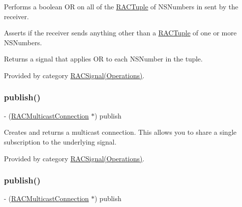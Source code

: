 Performs a boolean OR on all of the \mbox{\hyperlink{interface_r_a_c_tuple}{R\+A\+C\+Tuple}} of N\+S\+Numbers in sent by the receiver.

Asserts if the receiver sends anything other than a \mbox{\hyperlink{interface_r_a_c_tuple}{R\+A\+C\+Tuple}} of one or more N\+S\+Numbers.

Returns a signal that applies OR to each N\+S\+Number in the tuple. 

Provided by category \mbox{\hyperlink{category_r_a_c_signal_07_operations_08_aaf19b8314c8e554a7e5140ebffcd4f98}{R\+A\+C\+Signal(\+Operations)}}.

\mbox{\label{interface_r_a_c_signal_a16f260eea2cfd9a3953b95926d442a93}} 
\subsubsection{\texorpdfstring{publish()}{publish()}\hspace{0.1cm}{\footnotesize\ttfamily [1/3]}}
{\footnotesize\ttfamily -\/ (\mbox{\hyperlink{interface_r_a_c_multicast_connection}{R\+A\+C\+Multicast\+Connection}} $\ast$) publish \begin{DoxyParamCaption}{ }\end{DoxyParamCaption}}

Creates and returns a multicast connection. This allows you to share a single subscription to the underlying signal. 

Provided by category \mbox{\hyperlink{category_r_a_c_signal_07_operations_08_a16f260eea2cfd9a3953b95926d442a93}{R\+A\+C\+Signal(\+Operations)}}.

\mbox{\label{interface_r_a_c_signal_a16f260eea2cfd9a3953b95926d442a93}} 
\subsubsection{\texorpdfstring{publish()}{publish()}\hspace{0.1cm}{\footnotesize\ttfamily [2/3]}}
{\footnotesize\ttfamily -\/ (\mbox{\hyperlink{interface_r_a_c_multicast_connection}{R\+A\+C\+Multicast\+Connection}} $\ast$) publish \begin{DoxyParamCaption}{ }\end{DoxyParamCaption}}

